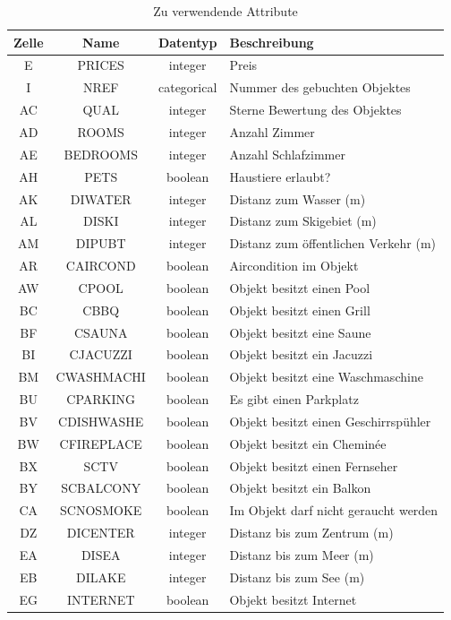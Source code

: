 \begin{table}[H] 
	\caption{Zu verwendende Attribute}
	\centering
		\label{fig:recherche:attributeinschraenkung:2}
	\begin{tabular}{ | c | c | c | l | } 
		\hline 
		\rowcolor{tableheadcolor}
		\bfseries Zelle & \bfseries Name & \bfseries Datentyp & \bfseries Beschreibung \\ \hline 
		E & PRICES & integer & Preis \\ \hline 
		I & NREF & categorical & Nummer des gebuchten Objektes \\ \hline 
		AC & QUAL & integer & Sterne Bewertung des Objektes \\ \hline 
		AD & ROOMS & integer & Anzahl Zimmer \\ \hline 
		AE & BEDROOMS & integer & Anzahl Schlafzimmer \\ \hline 
		AH & PETS & boolean & Haustiere erlaubt? \\ \hline 
		AK & DIWATER & integer & Distanz zum Wasser (m) \\ \hline 
		AL & DISKI & integer & Distanz zum Skigebiet (m) \\ \hline 
		AM & DIPUBT & integer & Distanz zum öffentlichen Verkehr (m) \\ \hline 
		AR & CAIRCOND & boolean & Aircondition im Objekt\\ \hline 
		AW & CPOOL & boolean & Objekt besitzt einen Pool \\ \hline 
		BC & CBBQ & boolean & Objekt besitzt einen Grill \\ \hline 
		BF & CSAUNA & boolean & Objekt besitzt eine Saune \\ \hline 
		BI & CJACUZZI & boolean & Objekt besitzt ein Jacuzzi \\ \hline 
		BM & CWASHMACHI & boolean & Objekt besitzt eine Waschmaschine \\ \hline 
		BU & CPARKING & boolean & Es gibt einen Parkplatz \\ \hline 
		BV & CDISHWASHE & boolean & Objekt besitzt einen Geschirrspühler \\ \hline
		BW & CFIREPLACE & boolean & Objekt besitzt ein Cheminée \\ \hline 
		BX & SCTV & boolean & Objekt besitzt einen Fernseher \\ \hline  
		BY & SCBALCONY & boolean & Objekt besitzt ein Balkon \\ \hline 
		CA & SCNOSMOKE & boolean & Im Objekt darf nicht geraucht werden \\ \hline 
		DZ & DICENTER & integer & Distanz bis zum Zentrum (m) \\ \hline 
		EA & DISEA & integer & Distanz bis zum Meer (m) \\ \hline 
		EB & DILAKE & integer & Distanz bis zum See (m) \\ \hline 
		EG & INTERNET & boolean & Objekt besitzt Internet \\ \hline 
	\end{tabular}
\end{table}

